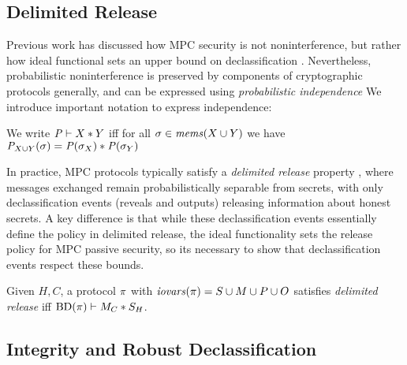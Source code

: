 \subsection{Delimited Release}

Previous work has discussed how MPC security is not noninterference,
but rather how ideal functional sets an upper bound on
declassification \cite{6266151,almeida2018enforcing}. Nevertheless,
probabilistic noninterference is preserved by components of
cryptographic protocols generally, and can be expressed using
\emph{probabilistic independence} \cite{darais2019language,barthe2019probabilistic}
We introduce important notation to express independence:
\begin{definition}
  We write $\mathit{P} \vdash X * Y$ iff for all
    $\sigma \in \mathit{mems}(X \cup Y)$ we have
  ${\mathit{P}}_{X \cup Y}(\sigma) =
  \mathit{P}(\sigma_X) * \mathit{P}(\sigma_Y)$
\end{definition}

In practice, MPC protocols typically satisfy a \emph{delimited release}
property \cite{sabelfeld2009declassification}, where messages exchanged remain probabilistically separable
from secrets, with only declassification events (reveals and outputs)
releasing information about honest secrets. A key difference is that while
these declassification events essentially define the policy in delimited
release, the ideal functionality sets the release policy for MPC
passive security, so its necessary to show that declassification events respect
these bounds.
\begin{definition}
  Given $H,C$, a protocol $\pi$ with $\mathit{iovars}(\pi) = S \cup M \cup P \cup O$
  satisfies \emph{delimited release} iff
  $\mathrm{BD}(\pi) \vdash M_C * S_H$.
\end{definition}

\subsection{Integrity and Robust Declassification}


